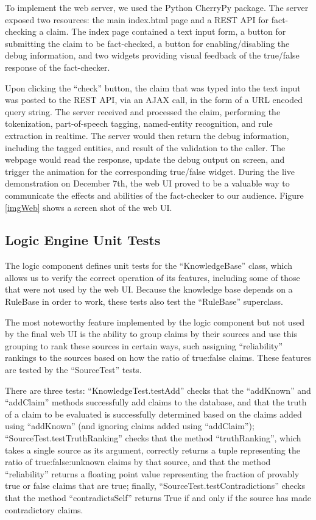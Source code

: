 \documentclass{chi2009}
\begin{document}
To implement the web server, we used the Python CherryPy package.  The server exposed two resources: the main index.html page and a REST API for fact-checking a claim.  The index page contained a text input form, a button for submitting the claim to be fact-checked, a button for enabling/disabling the debug information, and two widgets providing visual feedback of the true/false response of the fact-checker.  

Upon clicking the ``check'' button, the claim that was typed into the text input was posted to the REST API, via an AJAX call, in the form of a URL encoded query string.  The server received and processed the claim, performing the tokenization, part-of-speech tagging, named-entity recognition, and rule extraction in realtime.  The server would then return the debug information, including the tagged entities, and result of the validation to the caller.  The webpage would read the response, update the debug output on screen, and trigger the animation for the corresponding true/false widget.  During the live demonstration on December 7th, the web UI proved to be a valuable way to communicate the effects and abilities of the fact-checker to our audience. Figure \ref{imgWeb} shows a screen shot of the web UI. 

\subsection{Logic Engine Unit Tests}

The logic component defines unit tests for the ``KnowledgeBase'' class, which allows us to verify the correct operation of its features, including some of those that were not used by the web UI. Because the knowledge base depends on a RuleBase in order to work, these tests also test the ``RuleBase'' superclass.

The most noteworthy feature implemented by the logic component but not used by the final web UI is the ability to group claims by their sources and use this grouping to rank these sources in certain ways, such assigning ``reliability'' rankings to the sources based on how the ratio of true:false claims. These features are tested by the ``SourceTest'' tests.

There are three tests:
``KnowledgeTest.testAdd'' checks that the ``addKnown'' and ``addClaim'' methods successfully add claims to the database, and that the truth of a claim to be evaluated is successfully determined based on the claims added using ``addKnown'' (and ignoring claims added using ``addClaim'');
``SourceTest.testTruthRanking'' checks that the method ``truthRanking'', which takes a single source as its argument, correctly returns a tuple representing the ratio of true:false:unknown claims by that source, and that the method ``reliability'' returns a floating point value representing the fraction of provably true or false claims that are true;
finally, ``SourceTest.testContradictions'' checks that the method ``contradictsSelf'' returns True if and only if the source has made contradictory claims.
\end{document}
